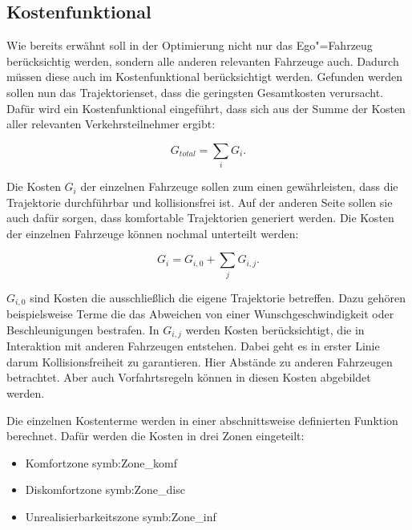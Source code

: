 \subsection{Kostenfunktional}
\label{sec:Kostfunc}
Wie bereits erw\"ahnt soll in der Optimierung nicht nur das Ego"=Fahrzeug ber\"ucksichtig werden, sondern alle anderen relevanten Fahrzeuge auch.
Dadurch m\"ussen diese auch im Kostenfunktional ber\"ucksichtigt werden.
Gefunden werden sollen nun das Trajektorienset, dass die geringsten Gesamtkosten verursacht.
Daf\"ur wird ein Kostenfunktional eingef\"uhrt, dass sich aus der Summe der Kosten aller relevanten Verkehrsteilnehmer ergibt:

\begin{equation}
G_{total} = \sum_i G_i .
\end{equation}

Die Kosten \( G_i \) der einzelnen Fahrzeuge sollen zum einen gew\"ahrleisten, dass die Trajektorie durchf\"uhrbar und kollisionsfrei ist. 
Auf der anderen Seite sollen sie auch daf\"ur sorgen, dass komfortable Trajektorien generiert werden.
Die Kosten der einzelnen Fahrzeuge k\"onnen nochmal unterteilt werden:

\begin{equation}
G_i = G_{i,0} + \sum_j G_{i,j}.
\end{equation}

\( G_{i,0} \) sind Kosten die ausschlie{\ss}lich die eigene Trajektorie betreffen. 
Dazu geh\"oren beispielsweise Terme die das Abweichen von einer Wunschgeschwindigkeit oder Beschleunigungen bestrafen.
In \( G_{i,j} \) werden Kosten ber\"ucksichtigt, die in Interaktion mit anderen Fahrzeugen entstehen.
Dabei geht es in erster Linie darum Kollisionsfreiheit zu garantieren.
Hier Abst\"ande zu anderen Fahrzeugen betrachtet.
Aber auch Vorfahrtsregeln k\"onnen in diesen Kosten abgebildet werden.

Die  einzelnen Kostenterme werden in einer abschnittsweise definierten Funktion berechnet.
Daf\"ur werden die Kosten in drei Zonen eingeteilt:

\begin{itemize}
\item Komfortzone \gls{symb:Zone_komf}
\item Diskomfortzone \gls{symb:Zone_disc}
\item Unrealisierbarkeitszone \gls{symb:Zone_inf}
\end{itemize}

